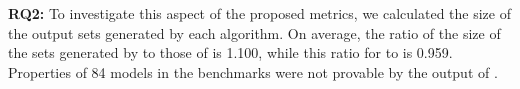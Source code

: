 \textbf{RQ2:} %
To investigate this aspect of the proposed metrics, we calculated the size of the output sets generated by each algorithm.  %
On average, the ratio of the size of the sets generated by \ucalg to those of \ucbfalg is 1.100,
while this ratio for \mustalg to \ucbfalg is 0.959. Properties of 84 models in the benchmarks were not provable by the output of \mustalg. 


